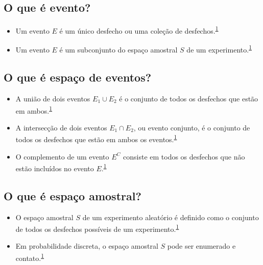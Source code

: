 \documentclass[
  a4paper,
]{book}
\begin{document}
\hypertarget{o-que-uxe9-evento}{%
\subsection{O que é evento?}\label{o-que-uxe9-evento}}

\begin{itemize}
\item
  Um evento \(E\) é um único desfecho ou uma coleção de desfechos.\textsuperscript{\protect\hyperlink{ref-grami2023}{1}}
\item
  Um evento \(E\) é um subconjunto do espaço amostral \(S\) de um experimento.\textsuperscript{\protect\hyperlink{ref-grami2023}{1}}
\end{itemize}

\hypertarget{o-que-uxe9-espauxe7o-de-eventos}{%
\subsection{O que é espaço de eventos?}\label{o-que-uxe9-espauxe7o-de-eventos}}

\begin{itemize}
\item
  A união de dois eventos \(E_{1} \cup E_{2}\) é o conjunto de todos os desfechos que estão em ambos.\textsuperscript{\protect\hyperlink{ref-grami2023}{1}}
\item
  A intersecção de dois eventos \(E_{1} \cap E_{2}\), ou evento conjunto, é o conjunto de todos os desfechos que estão em ambos os eventos.\textsuperscript{\protect\hyperlink{ref-grami2023}{1}}
\item
  O complemento de um evento \(E^C\) consiste em todos os desfechos que não estão incluídos no evento \(E\).\textsuperscript{\protect\hyperlink{ref-grami2023}{1}}
\end{itemize}

\hypertarget{o-que-uxe9-espauxe7o-amostral}{%
\subsection{O que é espaço amostral?}\label{o-que-uxe9-espauxe7o-amostral}}

\begin{itemize}
\item
  O espaço amostral \(S\) de um experimento aleatório é definido como o conjunto de todos os desfechos possíveis de um experimento.\textsuperscript{\protect\hyperlink{ref-grami2023}{1}}
\item
  Em probabilidade discreta, o espaço amostral \(S\) pode ser enumerado e contato.\textsuperscript{\protect\hyperlink{ref-grami2023}{1}}
\end{itemize}
\end{document}
